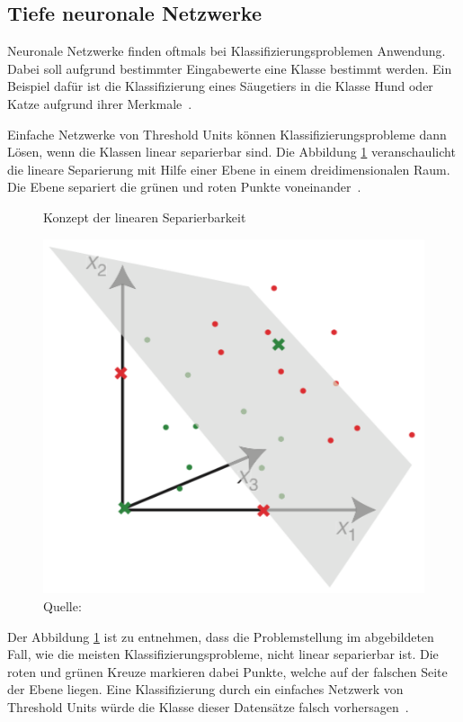 

\subsection{Tiefe neuronale Netzwerke}
\label{chap:deep-neural-nets}

Neuronale Netzwerke finden oftmals bei Klassifizierungsproblemen Anwendung. Dabei soll aufgrund bestimmter Eingabewerte eine Klasse bestimmt werden. Ein Beispiel dafür ist die Klassifizierung eines Säugetiers in die Klasse Hund oder Katze aufgrund ihrer Merkmale~\autocite{Krogh2008}.

Einfache Netzwerke von Threshold Units können Klassifizierungsprobleme dann Lösen, wenn die Klassen linear separierbar sind. Die Abbildung \ref{krogh:b} veranschaulicht die lineare Separierung mit Hilfe einer Ebene in einem dreidimensionalen Raum. Die Ebene separiert die grünen und roten Punkte voneinander~\autocite{Krogh2008}.

\begin{figure}[h!]
    \captionsetup{width=.9\linewidth}
    \caption{Konzept der linearen Separierbarkeit}
    \label{krogh:b}
    \centering
    \includegraphics[width=0.4\linewidth]{graphics/krogh/krogh_plane.png}
    \caption*{Quelle: \textcite{Krogh2008}}
\end{figure}

Der Abbildung \ref{krogh:b} ist zu entnehmen, dass die Problemstellung im abgebildeten Fall, wie die meisten Klassifizierungsprobleme, nicht linear separierbar ist. Die roten und grünen Kreuze markieren dabei Punkte, welche auf der falschen Seite der Ebene liegen. Eine Klassifizierung durch ein einfaches Netzwerk von Threshold Units würde die Klasse dieser Datensätze falsch vorhersagen~\autocite{Krogh2008}.

